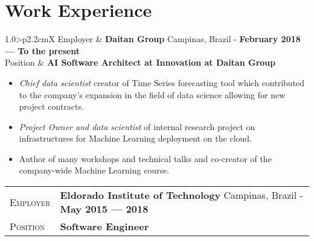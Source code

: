 \documentclass[9pt, a4paper, oneside, final]{scrartcl} %
\newcommand{\gray}{\rowcolor[gray]{.90}} %
\begin{document}


\section{Work Experience}

\begin{center}
\begin{tabularx}{1.0\linewidth}{>{\raggedleft\scshape}p{2.2cm}X}
\gray Employer & \textbf{Daitan Group} \hfill Campinas, Brazil - \textbf{February 2018 --- To the present}\\
\gray Position & \textbf{AI Software Architect at Innovation at Daitan Group}\\
\end{tabularx}
\end{center}

\begin{itemize}\itemsep1.0pt \parskip1.5pt 
\item \textit{Chief data scientist} creator of Time Series forecasting tool which contributed to the company’s expansion in the field of data science allowing for new project contracts.

\item \textit{Project Owner and data scientist} of internal research project on infrastructures for Machine Learning deployment on the cloud.

\item Author of many workshops and technical talks and co-creator of the company-wide Machine Learning course.  
\end{itemize}

\begin{center}
\begin{tabularx}{1.0\linewidth}{>{\raggedleft\scshape}p{2.2cm}X}
\gray Employer & \textbf{Eldorado Institute of Technology} \hfill Campinas, Brazil - \textbf{May 2015 --- 2018}\\
\gray Position & \textbf{Software Engineer}\\
\end{tabularx}
\end{center}
\end{document}
